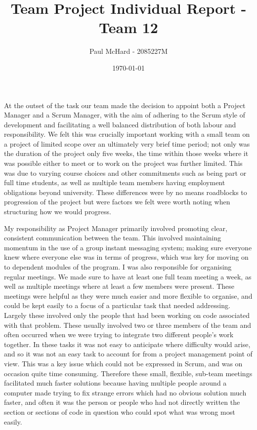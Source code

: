 \documentclass[12pt]{article}
\title{Team Project Individual Report - Team 12}
\author{Paul McHard - 2085227M}
\date{\today}
\begin{document}
\maketitle
At the outset of the task our team made the decision to appoint both a Project Manager and a Scrum Manager, with the aim of adhering to the Scrum style of development and facilitating a well balanced distribution of both labour and responsibility. We felt this was crucially important working with a small team on a project of limited scope over an ultimately very brief time period; not only was the duration of the project only five weeks, the time within those weeks where it was possible either to meet or to work on the project was further limited. This was due to varying course choices and other commitments such as being part or full time students, as well as multiple team members having employment obligations beyond university. These differences were by no means roadblocks to progression of the project but were factors we felt were worth noting when structuring how we would progress.

My responsibility as Project Manager primarily involved promoting clear, consistent communication between the team. This involved maintaining momentum in the use of a group instant messaging system; making sure everyone knew where everyone else was in terms of progress, which was key for moving on to dependent modules of the program. I was also responsible for organising regular meetings. We made sure to have at least one full team meeting a week, as well as multiple meetings where at least a few members were present. These meetings were helpful as they were much easier and more flexible to organise, and could be kept easily to a focus of a particular task that needed addressing. Largely these involved only the people that had been working on code associated with that problem. These usually involved two or three members of the team and often occurred when we were trying to integrate two different people's work together.  In these tasks it was not easy to anticipate where difficulty would arise, and so it was not an easy task to account for from a project management point of view. This was a key issue which could not be expressed in Scrum, and was on occasion quite time consuming. Therefore these small, flexible, sub-team meetings facilitated much faster solutions because having multiple people around a computer made trying to fix strange errors which had no obvious solution much faster, and often it was the person or people who had not directly written the section or sections of code in question who could spot what was wrong most easily. 
\end{document}
